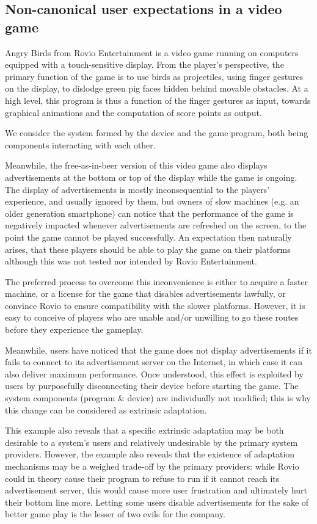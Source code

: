 \documentclass[a4paper]{article}
\begin{document}
\subsection{Non-canonical user expectations in a video game}

Angry Birds from Rovio Entertainment is a video game running on
computers equipped with a touch-sensitive display. From the player's
perspective, the primary function of the game is to use birds as
projectiles, using finger gestures on the display, to dislodge green
pig faces hidden behind movable obstacles. At a high level, this
program is thus a function of the finger gestures as input, towards
graphical animations and the computation of score points as
output.

We consider the system formed by the device and the game program, both
being components interacting with each other.

Meanwhile, the free-as-in-beer version of this video game also
displays advertisements at the bottom or top of the display while the
game is ongoing. The display of advertisements is mostly
inconsequential to the players' experience, and usually ignored by
them, but owners of slow machines (e.g. an older generation
smartphone) can notice that the performance of the game is negatively
impacted whenever advertisements are refreshed on the screen, to the
point the game cannot be played successfully. An expectation then
naturally arises, that these players should be able to play the game
on their platforms although this was not tested nor intended by Rovio
Entertainment.

The preferred process to overcome this inconvenience is either to
acquire a faster machine, or a license for the game that disables
advertisements lawfully, or convince Rovio to ensure compatibility
with the slower platforms. However, it is easy to conceive of players who are
unable and/or unwilling to go these routes before they experience the
gameplay.

Meanwhile, users have noticed that the game does not display
advertisements if it fails to connect to its advertisement server on
the Internet, in which case it can also deliver maximum
performance. Once understood, this effect is exploited by users by
purposefully disconnecting their device before starting the game.  The
system components (program \& device) are individually not modified;
this is why this change can be considered as extrinsic adaptation.

This example also reveals that a specific extrinsic adaptation
may be both desirable to a system's users and relatively undesirable
by the primary system providers. However, the example also reveals
that the existence of adaptation mechanisms may be a weighed trade-off
by the primary providers: while Rovio could in theory cause their
program to refuse to run if it cannot reach its advertisement server,
this would cause more user frustration and ultimately hurt their
bottom line more. Letting some users disable advertisements for the
sake of better game play is the lesser of two evils for the company.
\end{document}
